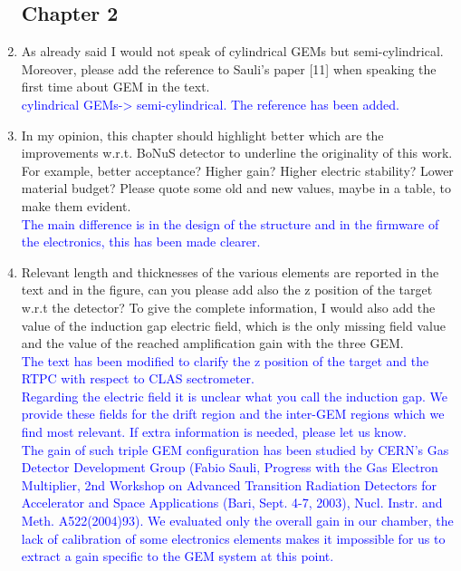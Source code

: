 \documentclass[a4paper,11pt,twoside]{article}
\begin{document}
\begin{enumerate}

\subsection*{Chapter 2}
\item As already said I would not speak of cylindrical GEMs but 
   semi-cylindrical. Moreover, please add the reference to Sauli's paper [11] 
   when speaking the first time about GEM in the text.\\
\textcolor{blue}{cylindrical GEMs-> semi-cylindrical. The reference has been added.} 

\item In my opinion, this chapter should highlight better which are the 
   improvements w.r.t. BoNuS detector to underline the originality of this 
   work. For example, better acceptance? Higher gain? Higher electric 
   stability? Lower material budget? Please quote some old and new values, 
   maybe in a table, to make them evident.\\
\textcolor{blue}{The main difference is in the design of the structure and in the
firmware of the electronics, this has been made clearer.} 

\item Relevant length and thicknesses of the various elements are reported in 
   the text and in the figure, can you please add also the z position of the 
   target w.r.t the detector? To give the complete information, I would also 
   add the value of the induction gap electric field, which is the only missing 
   field value and the value of the reached amplification gain with the three 
   GEM.\\
\textcolor{blue}{ The text has been modified to clarify the z position of the 
target and the RTPC with respect to CLAS sectrometer.\\
Regarding the electric field it is unclear what you call the induction gap. We
provide these fields for the drift region and the inter-GEM regions which we 
find most relevant. If extra information is needed, please let us know.\\
The gain of such triple GEM configuration has been studied by 
CERN's Gas Detector Development Group (Fabio Sauli, Progress with the Gas 
Electron Multiplier, 2nd Workshop on Advanced Transition Radiation Detectors 
for Accelerator and Space Applications (Bari, Sept. 4-7, 2003), Nucl. Instr. 
and Meth. A522(2004)93). We evaluated only the overall gain in our chamber, 
the lack of calibration of some electronics elements makes it impossible for 
us to extract a gain specific to the GEM system at this point.}


\end{enumerate}
\end{document}
